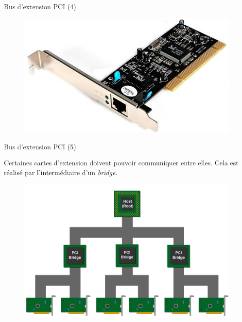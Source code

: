 \documentclass[12pt, t]{beamer}
\begin{document}
\begin{frame}{Bus d'extension PCI (4)}

    \begin{figure}
        \centering
        \includegraphics[scale=0.5]{network-card.jpg}
    \end{figure}

\end{frame}

\begin{frame}{Bus d'extension PCI (5)}

    \vspace{10pt}
    Certaines cartes d'extension doivent pouvoir communiquer entre elles. Cela
    est réalisé par l'intermédiaire d'un {\textit{bridge}}.

    \begin{figure}
        \centering
        \includegraphics[scale=0.5]{pci-bridges.png}
    \end{figure}

\end{frame}
\end{document}
